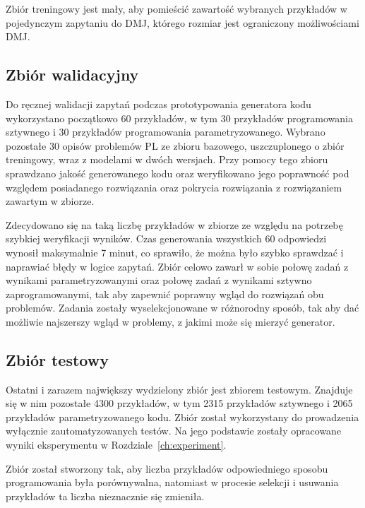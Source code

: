 Zbiór treningowy jest mały, aby pomieścić zawartość wybranych przykładów w pojedynczym zapytaniu do DMJ, którego rozmiar jest ograniczony możliwościami DMJ.

\subsection{Zbiór walidacyjny}

Do ręcznej walidacji zapytań podczas prototypowania generatora kodu   wykorzystano początkowo 60 przykładów, w tym 30 przykładów programowania sztywnego i 30 przykładów programowania parametryzowanego. Wybrano pozostałe 30 opisów problemów PL ze zbioru bazowego, uszczuplonego o zbiór treningowy, wraz z modelami  w dwóch wersjach. Przy pomocy tego zbioru sprawdzano jakość generowanego kodu   oraz weryfikowano jego poprawność pod względem posiadanego rozwiązania oraz pokrycia rozwiązania z rozwiązaniem zawartym w zbiorze.

Zdecydowano się na taką liczbę przykładów w zbiorze ze względu na potrzebę szybkiej weryfikacji wyników. Czas generowania wszystkich 60 odpowiedzi wynosił maksymalnie 7 minut, co sprawiło, że można było szybko sprawdzać i naprawiać błędy w logice zapytań. Zbiór celowo zawarł w sobie połowę zadań z wynikami parametryzowanymi oraz połowę zadań z wynikami sztywno zaprogramowanymi, tak aby zapewnić poprawny wgląd do rozwiązań obu problemów. Zadania zostały wyselekcjonowane w różnorodny sposób, tak aby dać możliwie najszerszy wgląd w problemy, z jakimi może się mierzyć generator. %

\subsection{Zbiór testowy}

Ostatni i zarazem największy wydzielony zbiór jest zbiorem testowym. Znajduje się w nim pozostałe 4300 przykładów, w tym 2315 przykładów sztywnego i 2065 przykładów parametryzowanego kodu. Zbiór został wykorzystany do prowadzenia wyłącznie zautomatyzowanych testów. Na jego podstawie zostały opracowane wyniki eksperymentu w Rozdziale~\ref{ch:experiment}.

Zbiór został stworzony tak, aby liczba przykładów odpowiedniego sposobu programowania była porównywalna, natomiast w procesie selekcji i usuwania przykładów ta liczba nieznacznie się zmieniła.

